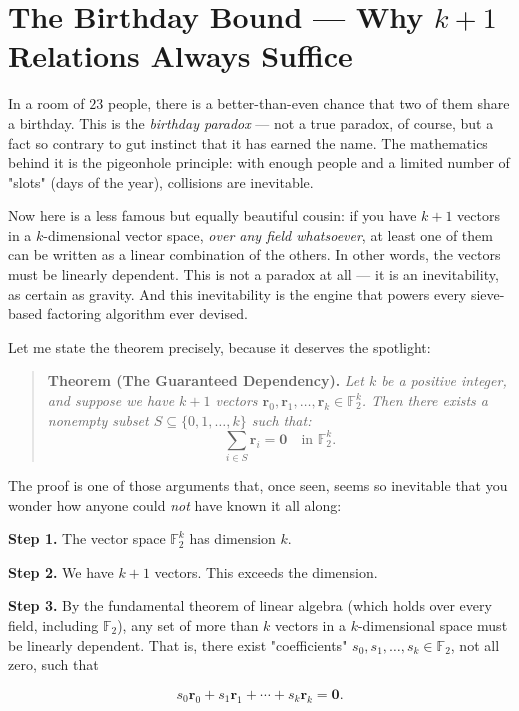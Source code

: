 \documentclass[11pt,twoside,openright]{book}
\theoremstyle{definition}
\theoremstyle{remark}
\begin{document}
\section{The Birthday Bound --- Why $k + 1$ Relations Always Suffice}

In a room of $23$ people, there is a better-than-even chance that two of them share a birthday. This is the \textit{birthday paradox} --- not a true paradox, of course, but a fact so contrary to gut instinct that it has earned the name. The mathematics behind it is the pigeonhole principle: with enough people and a limited number of "slots" (days of the year), collisions are inevitable.

Now here is a less famous but equally beautiful cousin: if you have $k + 1$ vectors in a $k$-dimensional vector space, \textit{over any field whatsoever}, at least one of them can be written as a linear combination of the others. In other words, the vectors must be linearly dependent. This is not a paradox at all --- it is an inevitability, as certain as gravity. And this inevitability is the engine that powers every sieve-based factoring algorithm ever devised.

Let me state the theorem precisely, because it deserves the spotlight:

\begin{quote}
\textbf{Theorem (The Guaranteed Dependency).} \textit{Let $k$ be a positive integer, and suppose we have $k + 1$ vectors $\mathbf{r}_0, \mathbf{r}_1, \ldots, \mathbf{r}_k \in \mathbb{F}_2^k$. Then there exists a nonempty subset $S \subseteq \{0, 1, \ldots, k\}$ such that:}
$$\sum_{i \in S} \mathbf{r}_i = \mathbf{0} \quad \text{in } \mathbb{F}_2^k.$$
\end{quote}
The proof is one of those arguments that, once seen, seems so inevitable that you wonder how anyone could \textit{not} have known it all along:

\textbf{Step 1.} The vector space $\mathbb{F}_2^k$ has dimension $k$.

\textbf{Step 2.} We have $k + 1$ vectors. This exceeds the dimension.

\textbf{Step 3.} By the fundamental theorem of linear algebra (which holds over every field, including $\mathbb{F}_2$), any set of more than $k$ vectors in a $k$-dimensional space must be linearly dependent. That is, there exist "coefficients" $s_0, s_1, \ldots, s_k \in \mathbb{F}_2$, not all zero, such that

\[s_0 \mathbf{r}_0 + s_1 \mathbf{r}_1 + \cdots + s_k \mathbf{r}_k = \mathbf{0}.\]
\end{document}
